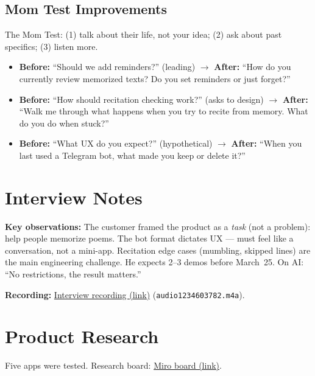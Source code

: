 \documentclass[11pt, a4paper]{article}
\begin{document}
\subsection*{Mom Test Improvements}
The Mom Test: (1) talk about their life, not your idea; (2) ask about past specifics; (3) listen more.
\begin{itemize}
    \item \textbf{Before:} ``Should we add reminders?'' (leading) $\rightarrow$ \textbf{After:} ``How do you currently review memorized texts? Do you set reminders or just forget?''
    \item \textbf{Before:} ``How should recitation checking work?'' (asks to design) $\rightarrow$ \textbf{After:} ``Walk me through what happens when you try to recite from memory. What do you do when stuck?''
    \item \textbf{Before:} ``What UX do you expect?'' (hypothetical) $\rightarrow$ \textbf{After:} ``When you last used a Telegram bot, what made you keep or delete it?''
\end{itemize}

\section{Interview Notes}
\textbf{Key observations:} The customer framed the product as a \textit{task} (not a problem): help people memorize poems. The bot format dictates UX --- must feel like a conversation, not a mini-app. Recitation edge cases (mumbling, skipped lines) are the main engineering challenge. He expects 2--3 demos before March~25. On AI: ``No restrictions, the result matters.''

\textbf{Recording:} \href{https://YOUR_LINK_HERE}{Interview recording (link)} (\texttt{audio1234603782.m4a}).


\section{Product Research}
Five apps were tested. Research board: \href{https://miro.com/welcome/NmRUUk1vMmlUdGlJQ1YwcDl0cEYzRnZDM0FESWJLZElpb0FFdzdNakFzMkQ0ODVOTGRxbjNWTHFrTHlyZzd6Ty9lN1QwYTBBSk9yUmNJSGFuczV1ZERNazZORkJuSXZ2WjNXYUV2ZEdZaGI4Wkw1N0p6Vy9hNlBDNjBWUWovZ0VnbHpza3F6REdEcmNpNEFOMmJXWXBBPT0hdjE=?share_link_id=125070385408}{Miro board (link)}.
\end{document}
